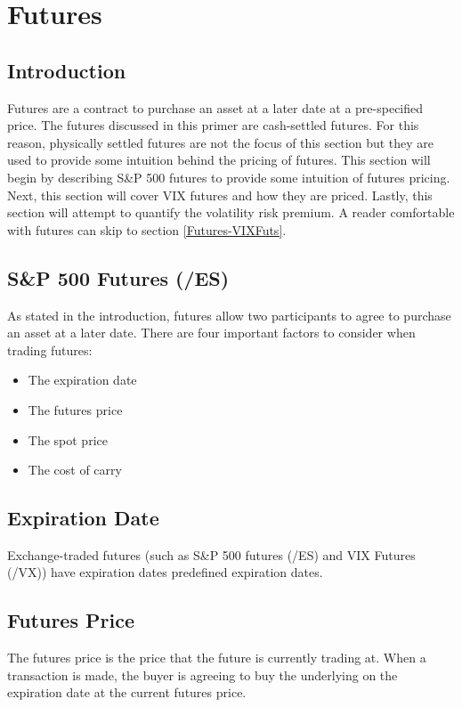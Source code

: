 \documentclass[11pt, oneside]{book}
\begin{document}
\chapter{Futures} \label{Futures}
\section{Introduction} \label{Futures-Intro}
Futures are a contract to purchase an asset at a later date at a pre-specified price. The futures discussed in this primer are cash-settled futures. For this reason, physically settled futures are not the focus of this section but they are used to provide some intuition behind the pricing of futures. This section will begin by describing S\&P 500 futures to provide some intuition of futures pricing. Next, this section will cover VIX futures and how they are priced. Lastly, this section will attempt to quantify the volatility risk premium. A reader comfortable with futures can skip to section \ref{Futures-VIXFuts}.
\\
\section{S\&P 500 Futures (/ES)} \label{Futures-ESFutures}
As stated in the introduction, futures allow two participants to agree to purchase an asset at a later date. There are four important factors to consider when trading futures:
\begin{itemize}
    \item The expiration date
    \item The futures price
    \item The spot price
    \item The cost of carry
\end{itemize}

\section{Expiration Date} \label{Futures-Expiration}
Exchange-traded futures (such as S\&P 500 futures (/ES) and VIX Futures (/VX)) have expiration dates predefined expiration dates.

\section{Futures Price} \label{Futures-FutPrice}
The futures price is the price that the future is currently trading at. When a transaction is made, the buyer is agreeing to buy the underlying on the expiration date at the current futures price.
\end{document}
